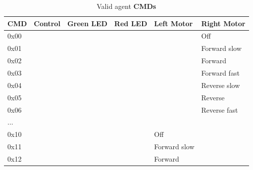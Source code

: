 \documentclass[a4paper]{article}
\begin{document}
      \begin{table}[h]
         \centering
         \caption{Valid agent \textbf{CMDs}}
         \label{tab_cmds}
         \begin{tabular}{|l|l|l|l|l|l|}
               \hline
               \textbf{CMD}   &  \textbf{Control}     &  \textbf{Green LED}   &  \textbf{Red LED}  &  \textbf{Left Motor}  &  \textbf{Right Motor} \\ \hline  
               0x00           &                       &                       &                    &                       &  Off                  \\ \hline   
               0x01           &                       &                       &                    &                       &  Forward slow         \\ \hline   
               0x02           &                       &                       &                    &                       &  Forward              \\ \hline   
               0x03           &                       &                       &                    &                       &  Forward fast         \\ \hline   
               0x04           &                       &                       &                    &                       &  Reverse slow         \\ \hline   
               0x05           &                       &                       &                    &                       &  Reverse              \\ \hline   
               0x06           &                       &                       &                    &                       &  Reverse fast         \\ \hline   
               ...            &                       &                       &                    &                       &                       \\ \hline   
               0x10           &                       &                       &                    &  Off                  &                       \\ \hline   
               0x11           &                       &                       &                    &  Forward slow         &                       \\ \hline   
               0x12           &                       &                       &                    &  Forward              &                       \\ \hline   

\end{tabular}
\end{table}
\end{document}
